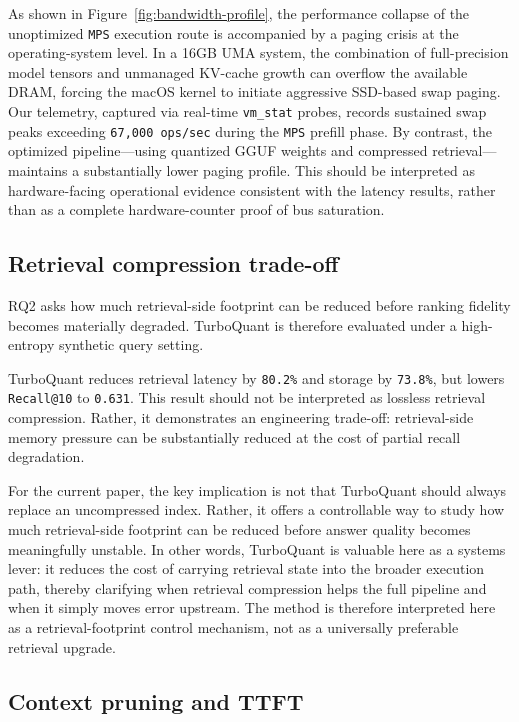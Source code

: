 \documentclass[10pt,twocolumn]{article}
\begin{document}
As shown in Figure~\ref{fig:bandwidth-profile}, the performance collapse of the unoptimized \texttt{MPS} execution route is accompanied by a paging crisis at the operating-system level. In a 16GB UMA system, the combination of full-precision model tensors and unmanaged KV-cache growth can overflow the available DRAM, forcing the macOS kernel to initiate aggressive SSD-based swap paging. Our telemetry, captured via real-time \texttt{vm\_stat} probes, records sustained swap peaks exceeding \texttt{67,000 ops/sec} during the \texttt{MPS} prefill phase. By contrast, the optimized pipeline---using quantized GGUF weights and compressed retrieval---maintains a substantially lower paging profile. This should be interpreted as hardware-facing operational evidence consistent with the latency results, rather than as a complete hardware-counter proof of bus saturation.

\subsection{Retrieval compression trade-off}

RQ2 asks how much retrieval-side footprint can be reduced before ranking fidelity becomes materially degraded. TurboQuant is therefore evaluated under a high-entropy synthetic query setting.



TurboQuant reduces retrieval latency by \texttt{80.2\%} and storage by \texttt{73.8\%}, but lowers \texttt{Recall@10} to \texttt{0.631}. This result should not be interpreted as lossless retrieval compression. Rather, it demonstrates an engineering trade-off: retrieval-side memory pressure can be substantially reduced at the cost of partial recall degradation.

For the current paper, the key implication is not that TurboQuant should always replace an uncompressed index. Rather, it offers a controllable way to study how much retrieval-side footprint can be reduced before answer quality becomes meaningfully unstable. In other words, TurboQuant is valuable here as a systems lever: it reduces the cost of carrying retrieval state into the broader execution path, thereby clarifying when retrieval compression helps the full pipeline and when it simply moves error upstream. The method is therefore interpreted here as a retrieval-footprint control mechanism, not as a universally preferable retrieval upgrade.

\subsection{Context pruning and TTFT}
\end{document}
